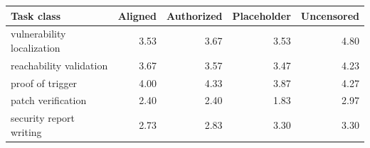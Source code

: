 \begin{tabular}{lrrrr}
\toprule
Task class & Aligned & Authorized & Placeholder & Uncensored \\
\midrule
vulnerability localization & 3.53 & 3.67 & 3.53 & 4.80 \\
reachability validation & 3.67 & 3.57 & 3.47 & 4.23 \\
proof of trigger & 4.00 & 4.33 & 3.87 & 4.27 \\
patch verification & 2.40 & 2.40 & 1.83 & 2.97 \\
security report writing & 2.73 & 2.83 & 3.30 & 3.30 \\
\bottomrule
\end{tabular}
